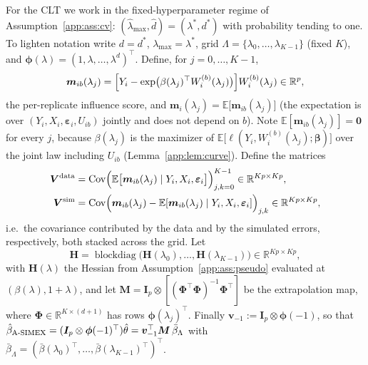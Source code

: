 \documentclass[11pt]{article}
\theoremstyle{plain}
\theoremstyle{definition}
\newcommand{\E}{\mathbb{E}}
\newcommand{\R}{\mathbb{R}}
\newcommand{\Cov}{\mathrm{Cov}}
\newcommand{\bet}{\bm{\beta}}
\newcommand{\beps}{\bm{\varepsilon}}
\newcommand{\bPhi}{\bm{\Phi}}
\newcommand{\bphi}{\bm{\phi}}
\newcommand{\btH}{\bm{H}}
\newcommand{\btV}{\bm{V}}
\newcommand{\bI}{\bm{I}}
\newcommand{\asimex}{\textup{A-SIMEX}}
\begin{document}
For the CLT we work in the fixed-hyperparameter regime of
Assumption~\ref{app:ass:cv}: $(\hat\lambda_{\max},\hat d)=(\lambda^*,d^*)$
with probability tending to one. To lighten notation write
$d=d^*$, $\lambda_{\max}=\lambda^*$, grid
$\Lambda=\{\lambda_0,\dots,\lambda_{K-1}\}$ (fixed $K$), and
$\bphi(\lambda)=(1,\lambda,\dots,\lambda^d)^\top$.
Define, for $j=0,\dots,K-1$,
\[
  \bm m_{ib}(\lambda_j)
  =\Bigl[Y_i-\exp\bigl(\beta(\lambda_j)^\top W_i^{(b)}(\lambda_j)\bigr)\Bigr]
   W_i^{(b)}(\lambda_j)\in\R^p,
\]
the per-replicate influence score, and
$\bm m_i(\lambda_j)=\E\bigl[\bm m_{ib}(\lambda_j)\bigr]$ (the expectation
is over $(Y_i,X_i,\beps_i,U_{ib})$ jointly and does not depend on $b$).
Note $\E[\bm m_{ib}(\lambda_j)]=\bm 0$ for every $j$, because
$\beta(\lambda_j)$ is the maximizer of
$\E\bigl[\ell(Y_i,W_i^{(b)}(\lambda_j);\bet)\bigr]$ over the joint law
including $U_{ib}$ (Lemma~\ref{app:lem:curve}). Define the matrices
\begin{align}
  \btV^{\mathrm{data}}
  &=\Cov\Bigl(\E\bigl[\bm m_{ib}(\lambda_j)\mid
        Y_i,X_i,\beps_i\bigr]\Bigr)_{j,k=0}^{K-1}
   \in\R^{Kp\times Kp},\label{app:eq:vdata}\\
  \btV^{\mathrm{sim}}
  &=\Cov\Bigl(\bm m_{ib}(\lambda_j)-\E[\bm m_{ib}(\lambda_j)\mid
        Y_i,X_i,\beps_i]\Bigr)_{j,k}
   \in\R^{Kp\times Kp},\label{app:eq:vsim}
\end{align}
i.e.\ the covariance contributed by the data and by the simulated errors,
respectively, both stacked across the grid. Let
\[
  \btH=\operatorname{blockdiag}\bigl(\bm H(\lambda_0),\dots,
        \bm H(\lambda_{K-1})\bigr)\in\R^{Kp\times Kp},
\]
with $\bm H(\lambda)$ the Hessian from Assumption~\ref{app:ass:pseudo}
evaluated at $(\beta(\lambda),1+\lambda)$, and let
$\bm M=\bI_{p}\otimes[(\bPhi^\top\bPhi)^{-1}\bPhi^\top]$ be the
extrapolation map, where $\bPhi\in\R^{K\times(d+1)}$ has rows
$\bphi(\lambda_j)^\top$. Finally
$\bm v_{-1}:=\bI_p\otimes\bphi(-1)$, so that
$\hat\beta_{\asimex}=(\bI_p\otimes\bphi(-1)^\top)\hat\theta
=\bm v_{-1}^\top\bm M\,\bar\beta_{\Lambda}$
with $\bar\beta_{\Lambda}
=(\bar\beta(\lambda_0)^\top,\dots,\bar\beta(\lambda_{K-1})^\top)^\top$.
\end{document}
